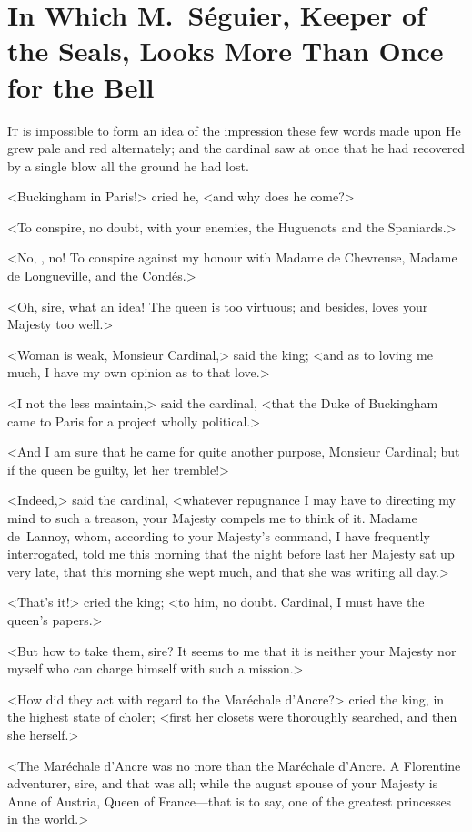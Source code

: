 
\chapter{In Which M.~Séguier, Keeper of the Seals, Looks More Than Once for the Bell}

\lettrine{I}{t} is impossible to form an idea of the impression these few words made upon  He grew pale and red alternately; and the cardinal saw at once that he had recovered by a single blow all the ground he had lost. 

\zz
<Buckingham in Paris!> cried he, <and why does he come?> 

<To conspire, no doubt, with your enemies, the Huguenots and the Spaniards.> 

<No, , no! To conspire against my honour with Madame de Chevreuse, Madame de Longueville, and the Condés.> 

<Oh, sire, what an idea! The queen is too virtuous; and besides, loves your Majesty too well.> 

<Woman is weak, Monsieur Cardinal,> said the king; <and as to loving me much, I have my own opinion as to that love.> 

<I not the less maintain,> said the cardinal, <that the Duke of Buckingham came to Paris for a project wholly political.> 

<And I am sure that he came for quite another purpose, Monsieur Cardinal; but if the queen be guilty, let her tremble!> 

<Indeed,> said the cardinal, <whatever repugnance I may have to directing my mind to such a treason, your Majesty compels me to think of it. Madame de~Lannoy, whom, according to your Majesty's command, I have frequently interrogated, told me this morning that the night before last her Majesty sat up very late, that this morning she wept much, and that she was writing all day.> 

<That's it!> cried the king; <to him, no doubt. Cardinal, I must have the queen's papers.> 

<But how to take them, sire? It seems to me that it is neither your Majesty nor myself who can charge himself with such a mission.> 

<How did they act with regard to the Maréchale d'Ancre?> cried the king, in the highest state of choler; <first her closets were thoroughly searched, and then she herself.> 

<The Maréchale d'Ancre was no more than the Maréchale d'Ancre. A Florentine adventurer, sire, and that was all; while the august spouse of your Majesty is Anne of Austria, Queen of France—that is to say, one of the greatest princesses in the world.> 

